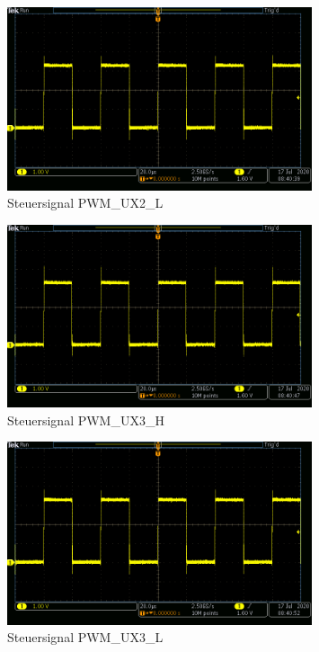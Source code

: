 \begin{appendix}
\begin{figure}[h!]
\center
\includegraphics[width = 0.8\textwidth]{graphics/PWM_UX2_L}
\caption{Steuersignal PWM\_UX2\_L}
\label{fig:PWM_UX2_L}
\end{figure}

\newpage

\begin{figure}[h!]
\center
\includegraphics[width = 0.8\textwidth]{graphics/PWM_UX3_H}
\caption{Steuersignal PWM\_UX3\_H}
\label{fig:PWM_UX3_H}
\end{figure}

\begin{figure}[h!]
\center
\includegraphics[width = 0.8\textwidth]{graphics/PWM_UX3_L}
\caption{Steuersignal PWM\_UX3\_L}
\label{fig:PWM_UX3_L}
\end{figure}


\end{appendix}
